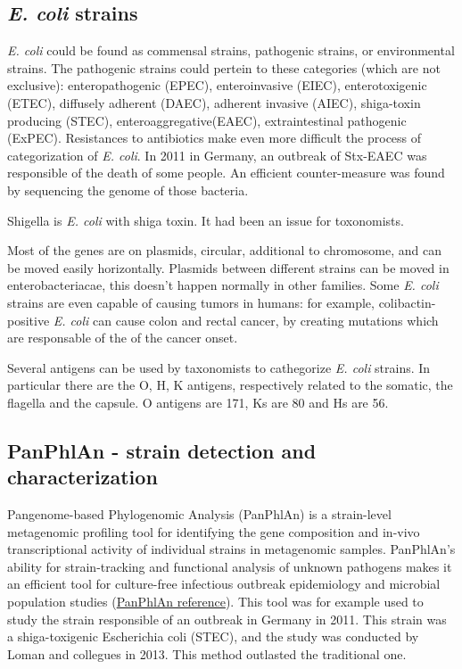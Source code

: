 \subsection{\emph{E. coli} strains}
\emph{E. coli} could be found as commensal strains, pathogenic strains, or environmental strains. The pathogenic strains could pertein to these categories (which are not exclusive): enteropathogenic (EPEC), enteroinvasive (EIEC), enterotoxigenic (ETEC), diffusely adherent (DAEC), adherent invasive (AIEC), shiga-toxin producing (STEC), enteroaggregative(EAEC), extraintestinal pathogenic (ExPEC). Resistances to antibiotics make even more difficult the process of categorization of \emph{E. coli}.
In 2011 in Germany, an outbreak of Stx-EAEC was responsible of the death of some people. An efficient counter-measure was found by sequencing the genome of those bacteria.

Shigella is \emph{E. coli} with shiga toxin. It had been an issue for toxonomists.

Most of the genes are on plasmids, circular, additional to chromosome, and can be moved easily horizontally. Plasmids between different strains can be moved in enterobacteriacae, this doesn't happen normally in other families.
Some \emph{E. coli} strains are even capable of causing tumors in humans: for example, colibactin-positive \emph{\emph{E. coli}} can cause colon and rectal cancer, by creating mutations which are responsable of the of the cancer onset.

Several antigens can be used by taxonomists to cathegorize \emph{E. coli} strains. In particular there are the O, H, K antigens, respectively related to the somatic, the flagella and the capsule. O antigens are 171, Ks are 80 and Hs are 56.

\subsection{PanPhlAn - strain detection and characterization}

Pangenome-based Phylogenomic Analysis (PanPhlAn) is a strain-level metagenomic profiling tool for identifying the gene composition and in-vivo transcriptional activity of individual strains in metagenomic samples. PanPhlAn’s ability for strain-tracking and functional analysis of unknown pathogens makes it an efficient tool for culture-free infectious outbreak epidemiology and microbial population studies (\href{http://segatalab.cibio.unitn.it/tools/panphlan/}{PanPhlAn reference}). This tool was for example used to study the strain responsible of an outbreak in Germany in 2011. This strain was a shiga-toxigenic Escherichia coli (STEC), and the study was conducted by Loman and collegues in 2013.
This method outlasted the traditional one.


